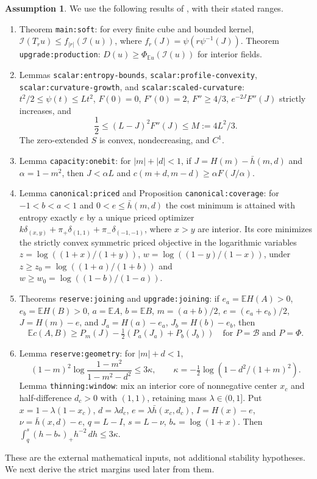 \documentclass[11pt,reqno]{amsart}
\numberwithin{equation}{section}
\theoremstyle{definition}
\newtheorem{assumption}[theorem]{Assumption}
\theoremstyle{remark}
\newcommand{\E}{\mathbb E}
\newcommand{\cB}{\mathcal B}
\newcommand{\cI}{\mathcal I}
\begin{document}
\begin{assumption}\label{ass:inputs}
We use the following results of \cite{OpenAI}, with their stated ranges.
\begin{enumerate}
\item Theorem \texttt{main:soft}: for every finite cube and bounded
kernel, $\cI(T_ru)\le f_{|r|}(\cI(u))$, where
$f_r(J)=\psi(r\psi^{-1}(J))$. Theorem \texttt{upgrade:production}:
$D(u)\ge\Phi_{\E u}(\cI(u))$ for interior fields.
\item Lemmas \texttt{scalar:entropy-bounds},
\texttt{scalar:profile-convexity},\\ \texttt{scalar:curvature-growth}, and
\texttt{scalar:scaled-curvature}: $t^2/2\le\psi(t)\le Lt^2$,
$F(0)=0$, $F'(0)=2$, $F''\ge4/3$,
$e^{-2J}F''(J)$ strictly increases, and
\[
 \frac12\le (L-J)^2F''(J)\le M:=4L^2/3.
\]
The zero-extended $S$ is convex, nondecreasing, and $C^1$.
\item Lemma \texttt{capacity:onebit}: for $|m|+|d|<1$, if
$J=H(m)-\bar h(m,d)$ and $\alpha=1-m^2$, then
$J<\alpha L$ and $c(m+d,m-d)\ge\alpha F(J/\alpha)$.
\item Lemma \texttt{canonical:priced} and Proposition
\texttt{canonical:coverage}: for $-1<b<a<1$ and
$0<e\le\bar h(m,d)$ the cost minimum is attained with entropy exactly
$e$ by a unique priced optimizer
$k\delta_{(x,y)}+\pi_+\delta_{(1,1)}+\pi_-\delta_{(-1,-1)}$,
where $x>y$ are interior. Its core minimizes the strictly convex symmetric
priced objective in the logarithmic variables
$z=\log((1+x)/(1+y))$, $w=\log((1-y)/(1-x))$, under
$z\ge z_0=\log((1+a)/(1+b))$ and
$w\ge w_0=\log((1-b)/(1-a))$.
\item Theorems \texttt{reserve:joining} and \texttt{upgrade:joining}:
if $e_a=\E H(A)>0$, $e_b=\E H(B)>0$, $a=\E A$, $b=\E B$,
$m=(a+b)/2$, $e=(e_a+e_b)/2$, $J=H(m)-e$, and
$J_a=H(a)-e_a$, $J_b=H(b)-e_b$, then
\[
 \E c(A,B)\ge P_m(J)-\tfrac12(P_a(J_a)+P_b(J_b))
 \quad\text{for }P=\cB\text{ and }P=\Phi.
\]
\item Lemma \texttt{reserve:geometry}: for $|m|+d<1$,
\[
 (1-m)^2\log\frac{1-m^2}{1-m^2-d^2}
 \le3\kappa,\qquad
 \kappa=-\tfrac12\log(1-d^2/(1+m)^2).
\]
Lemma \texttt{thinning:window}: mix an interior core of nonnegative
center $x_c$ and half-difference $d_c>0$ with $(1,1)$, retaining mass
$\lambda\in(0,1]$. Put $x=1-\lambda(1-x_c)$, $d=\lambda d_c$,
$e=\lambda\bar h(x_c,d_c)$, $I=H(x)-e$,
$\nu=\bar h(x,d)-e$, $q=L-I$, $s=L-\nu$, $b_*=\log(1+x)$.
Then $\int_q^s(h-b_*)_+h^{-2}\,dh\le3\kappa$.
\end{enumerate}
\end{assumption}
These are the external mathematical inputs, not additional stability
hypotheses. We next derive the strict margins used later from them.
\end{document}
